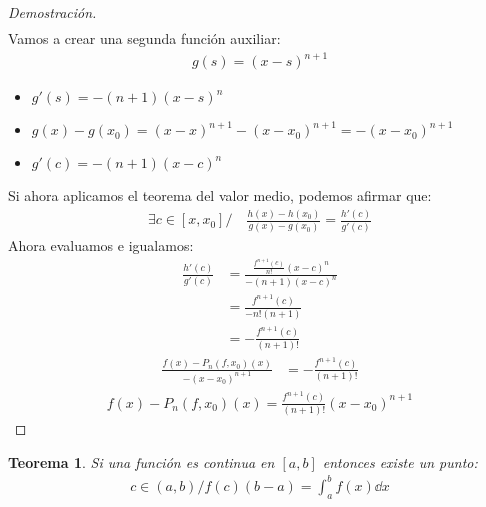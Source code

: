 \documentclass{article}
\newtheorem{theorem}{Teorema}
\begin{document}
\begin{proof}[Demostración]
\begin{equation}
\begin{split}
        \end{split}
    \end{equation}
    Vamos a crear una segunda función auxiliar:
    \begin{equation}
        \begin{split}
            g(s)= (x-s)^{n+1}
        \end{split}
    \end{equation}
    \begin{itemize}
        \item $g'(s)=-(n+1)(x-s)^{n}$
        \item $g(x) -g(x_{0})= (x-x)^{n+1} - (x-x_{0})^{n+1}= - (x-x_{0})^{n+1}$
        \item $g'(c)= -(n+1)(x-c)^{n}$
    \end{itemize}
    Si ahora aplicamos el teorema del valor medio, podemos afirmar que:
    \begin{equation}
        \begin{split}
            \exists c \in [x,x_{0}] / \quad \frac{h(x)-h(x_{0})}{g(x)-g(x_{0})} = \frac{h'(c)}{g'(c)}
        \end{split}
    \end{equation}
    Ahora evaluamos e igualamos:
    \begin{equation}
	    \begin{split} 
            \frac{h'(c)}{g'(c)} &= \frac{\frac{f^{n+1}(c)}{n!}(x-c)^{n}}{-(n+1)(x-c)^{n}}\\
            &= \frac{f^{n+1}(c)}{-n!(n+1)} \\
            &= -\frac{f^{n+1}(c)}{(n+1)!}
        \end{split}
    \end{equation}
    \begin{equation}
        \begin{split}
        	\frac{f(x)- P_{n}(f,x_{0})(x)}{-(x-x_{0})^{n+1}} &= -\frac{f^{n+1}(c)}{(n+1)!}
	\end{split}
    \end{equation}
\begin{equation}
	\begin{split}
		\boxed{f(x)- P_{n}(f,x_{0})(x) = \frac{f^{n+1}(c)}{(n+1)!}(x-x_{0})^{n+1}}
	\end{split}
\end{equation}    
\end{proof}
\begin{theorem}
    Si una función es continua en $[a,b]$ entonces existe un punto:
    \begin{equation}
        \begin{split}
            c \in (a,b) / f(c)(b-a) = \int_{a}^b f(x) \dd{x}
        \end{split}
    \end{equation}
\end{theorem}
\end{document}
